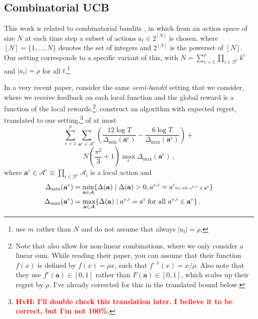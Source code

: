 \documentclass{article}
\newcommand{\hvh}[1]{\textcolor{red}{\bf HvH: #1}}
\begin{document}
\subsection{Combinatorial UCB}
This work is related to combinatorial bandits \citep{bubeck2012regret, cesa2012combinatorial, gai2012combinatorial, chen2013combinatorial}, in which from an action space of size $N$ at each time step a subset of actions $a_t \in 2^{[N]}$ is chosen, where $[N] = \{ 1, \ldots, N \}$ denotes the set of integers and $2^{[N]}$ is the powerset of $[N]$.  Our setting corresponds to a specific variant of this, with $N = \sum_{e = 1}^\rho \prod_{i \in \mathcal{D}^e} k^i$ and $|a_t| = \rho$ for all $t$.\footnote{\citet{chen2013combinatorial} use $m$ rather than $N$ and do not assume that always $|a_t| = \rho$.}

In a very recent paper, \citet{chen2013combinatorial} consider the same \emph{semi-bandit} setting \citep{audibert2011minimax} that we consider, where we receive feedback on each local function and the global reward is a function of the local rewards.\footnote{Note that \citeauthor{chen2013combinatorial} also allow for non-linear combinations, where we only consider a linear sum. While reading their paper, you can assume that their function $f(x)$ is defined by $f(x) = \rho x$, such that $f^{-1}(x) = x/\rho$. Also note that they use $f^e(\mathbf{a}) \in [0,1]$ rather than $F(\mathbf{a}) \in [0,1]$, which scales up their regret by $\rho$. I've already corrected for this in the translated bound below.}. \citeauthor{chen2013combinatorial} construct an algorithm with expected regret, translated to our setting,\footnote{\hvh{I'll double check this translation later. I believe it to be correct, but I'm not 100\%.}} of at most
\[
\sum_{e=1}^\rho \sum_{\mathbf{a}^e \in \mathcal{A}^e} \left( \frac{ 12 \log T }{ \Delta_{\min}(\mathbf{a}^e) } - \frac{ 6 \log T }{ \Delta_{\max}(\mathbf{a}^e) } \right) +
\] \[
 N \left( \frac{ \pi^2}{ 3} + 1 \right)  \max_e \Delta_{\max}(\mathbf{a}^e) \,,
\]
where $\mathbf{a}^e \in \mathcal{A}^e \equiv \prod_{i \in \mathcal{D}^e} \mathcal{A}_i$ is a local action and
\begin{align*}
\Delta_{\min}(\mathbf{a}^e) & = \min_{\mathbf{a}\in\mathcal{A}} \{ \Delta(\mathbf{a}) \mid \Delta(\mathbf{a}) > 0, a^{e,i} = a^i \text{\tiny for all $a^{e,i} \in \mathbf{a}^e$} \} \\
\Delta_{\max}(\mathbf{a}^e) & = \max_{\mathbf{a}\in\mathcal{A}} \{ \Delta(\mathbf{a}) \mid a^{e,i} = a^i \text{ for all $a^{e,i} \in \mathbf{a}^e$}\}\,.
\end{align*}
\end{document}
